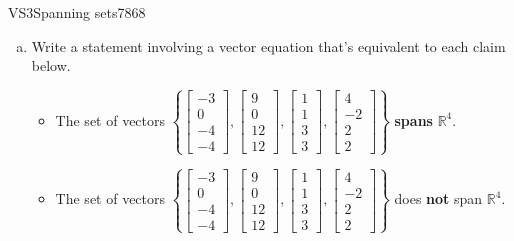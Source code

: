 \begin{exercise}{VS3}{Spanning sets}{7868} 
\begin{exerciseStatement} 

\begin{enumerate}[(a)]
\item  

 Write a statement involving a vector equation that's equivalent to each claim below. 

 

\begin{itemize}
\item  

 The set of vectors \(\left\{ \left[\begin{array}{c}
-3 \\
0 \\
-4 \\
-4
\end{array}\right] , \left[\begin{array}{c}
9 \\
0 \\
12 \\
12
\end{array}\right] , \left[\begin{array}{c}
1 \\
1 \\
3 \\
3
\end{array}\right] , \left[\begin{array}{c}
4 \\
-2 \\
2 \\
2
\end{array}\right] \right\}\) \textbf{spans} \(\mathbb R^4\). 

 
\item  

 The set of vectors \(\left\{ \left[\begin{array}{c}
-3 \\
0 \\
-4 \\
-4
\end{array}\right] , \left[\begin{array}{c}
9 \\
0 \\
12 \\
12
\end{array}\right] , \left[\begin{array}{c}
1 \\
1 \\
3 \\
3
\end{array}\right] , \left[\begin{array}{c}
4 \\
-2 \\
2 \\
2
\end{array}\right] \right\}\) does \textbf{not} span \(\mathbb R^4\). 


\end{itemize}
\end{enumerate}
\end{exerciseStatement}
\end{exercise}

